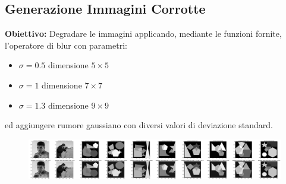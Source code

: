 {\color{bblue}\subsection{Generazione Immagini Corrotte}}
\textbf{Obiettivo:}
Degradare le immagini applicando, mediante le funzioni fornite, l'operatore di blur con parametri:
\begin{itemize}
    \item{$\sigma=0.5$ dimensione $5\times 5$}
    \item{$\sigma=1$ dimensione $7\times 7$}
    \item{$\sigma=1.3$ dimensione $9\times 9$}
\end{itemize}
ed aggiungere rumore gaussiano con diversi valori di deviazione standard.

\begin{figure}[H]
    \centering
    \begin{minipage}[h]{\textwidth}
        \centering
        \includegraphics[width=\linewidth]{output/tabCorrotte/imgcorr1.png}\label{fig:imgcorrotte1}
    \end{minipage}
    \begin{minipage}[h]{0.55\textwidth}
        \centering
\end{minipage}
\end{figure}

